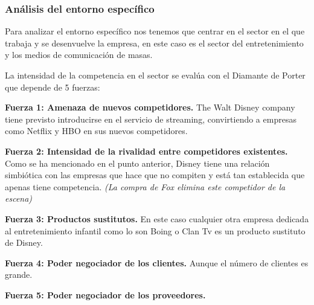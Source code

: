 \subsubsection{Análisis del entorno específico}
Para analizar el entorno específico nos tenemos que centrar en el sector en el que trabaja y se desenvuelve la empresa, en este caso es el sector del entretenimiento y los medios de comunicación de masas.

La intensidad de la competencia en el sector se evalúa con el Diamante de Porter que depende de 5 fuerzas:

\textbf{Fuerza 1: Amenaza de nuevos competidores.} The Walt Disney company tiene previsto introducirse en el servicio de streaming, convirtiendo a empresas como Netflix y HBO en sus nuevos competidores.

\textbf{Fuerza 2: Intensidad de la rivalidad entre competidores existentes.} Como se ha mencionado en el punto anterior, Disney tiene una relación simbiótica con las empresas que hace que no compiten y está tan establecida que apenas tiene competencia. \textit{(La compra de Fox elimina este competidor de la escena)}

\textbf{Fuerza 3: Productos sustitutos.} En este caso cualquier otra empresa dedicada al entretenimiento infantil como lo son Boing o Clan Tv es un producto sustituto de Disney.

\textbf{Fuerza 4: Poder negociador de los clientes.} Aunque el número de clientes es grande.

\textbf{Fuerza 5: Poder negociador de los proveedores.}